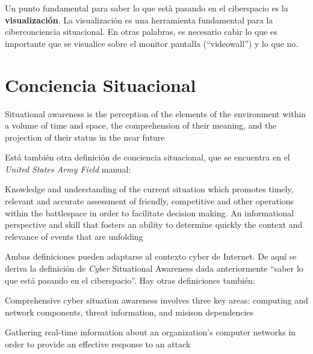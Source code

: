 
Un punto fundamental para saber lo que està pasando en el ciberspacio es la \textbf{visualización}. La visualización es una herramienta fundamental para la ciberconciencia situacional.
En otras palabras, es necesario cabir lo que es importante que se visualice sobre el monitor pantalla (``videowall'') y lo que no.

\section{Conciencia Situacional}
\begin{definition}
   Situational awareness is the perception of the elements of the environment within
   a volume of time and space, the comprehension of their meaning, and the
   projection of their status in the near future
\end{definition}

Está también otra definición de conciencia situacional, que se encuentra en el \textit{United States Army Field} manual:
\begin{definition}
   Knowledge and understanding of the current situation which promotes timely, relevant and accurate assessment of friendly, competitive and other operations within the battlespace in order to facilitate decision making. An informational perspective and skill that fosters an ability to determine quickly the context and relevance of events that are unfolding   
\end{definition}

Ambas definiciones pueden adaptarse al contexto cyber de Internet.
De aquí se deriva la definición de \textit{Cyber} Situational Awareness dada anteriormente ``saber lo que está pasando en el ciberspacio''.
Hay otras definiciones también:
\begin{definition}
   Comprehensive cyber situation awareness involves three key areas: computing and network components, threat information, and misison dependencies
\end{definition}

\begin{definition}
   Gathering real-time information about an organization's computer networks in order to provide an effective response to an attack
\end{definition}


